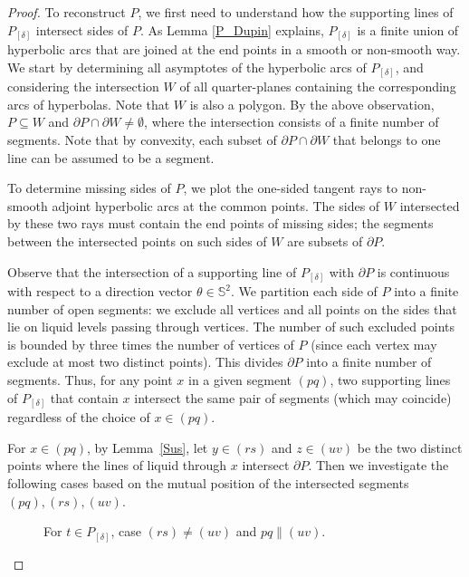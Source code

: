\documentclass[10pt,a4paper]{amsart}
\begin{document}
\begin{proof}
    To reconstruct $P$, we first need to understand how the supporting lines of $P_{[\delta]}$ intersect sides of $P$. As Lemma \ref{P_Dupin} explains, $P_{[\delta]}$ is a finite union of hyperbolic arcs that are joined at the end points in a smooth or non-smooth way. We start by determining all asymptotes of the hyperbolic arcs of $P_{[\delta]}$, and considering the intersection $W$ of all quarter-planes containing the corresponding arcs of hyperbolas. Note that $W$ is also a polygon. By the above observation, $P \subseteq W$ and $\partial P \cap \partial W \neq \emptyset$, where the intersection consists of a finite number of segments. Note that by convexity, each subset of $\partial P \cap \partial W$ that belongs to one line can be assumed to be a segment.
    
    To determine missing sides of $P$, we plot the one-sided tangent rays to non-smooth adjoint hyperbolic arcs at the common points. The sides of $W$ intersected by these two rays must contain the end points of missing sides; the segments between the intersected points on such sides of $W$ are subsets of $\partial P$.
    
    Observe that the intersection of a supporting line of $P_{[\delta]}$ with $\partial P$ is continuous with respect to a direction vector $\theta \in \mathbb{S}^2$.
    We partition each side of $P$ into a finite number of open segments: we exclude all vertices and all points on the sides that lie on liquid levels passing through vertices.
    The number of such excluded points is bounded by three times the number of vertices of $P$ (since each vertex may exclude at most two distinct points).
    This divides $\partial P$ into a finite number of segments. 
    Thus, for any point $x$ in a given segment $(pq)$, two supporting lines of $P_{[\delta]}$ that contain $x$ intersect the same pair of segments (which may coincide) regardless of the choice of $x \in (pq)$.

    
    For $x \in (pq)$, by Lemma~\ref{Sus}, let $y \in (rs)$ and $z \in (uv)$ be the two distinct points where the lines of liquid through $x$ intersect $\partial P$. 
    Then we investigate the following cases based on the mutual position of the intersected segments $(pq), (rs), (uv)$.

       \begin{figure}[h!]
        \centering
        
         \caption{For $t \in P_{[\delta]}$, case $(rs)\neq (uv)$ and $pq \parallel (uv)$.}
    \label{fig:2DParallel}
     \end{figure}
     

\end{proof}
\end{document}
